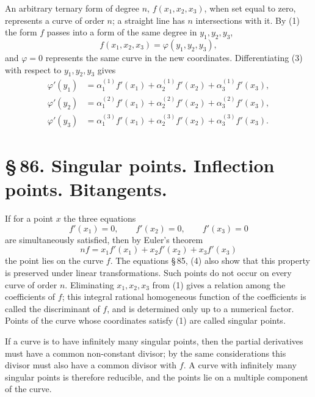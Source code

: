 \documentclass[11pt]{article}
\begin{document}
An arbitrary ternary form of degree $n$, $f(x_1,x_2,x_3)$, when set equal to zero, represents a curve of order $n$; a straight line has $n$ intersections with it. By (1) the form $f$ passes into a form of the same degree in $y_1,y_2,y_3$,
\begin{equation}
 f(x_1,x_2,x_3)=\varphi(y_1,y_2,y_3),
 \tag{3}
\end{equation}
and $\varphi=0$ represents the same curve in the new coordinates. Differentiating (3) with respect to $y_1,y_2,y_3$ gives
\begin{equation}
\begin{aligned}
 \varphi'(y_1)&=\alpha^{(1)}_1 f'(x_1)+\alpha^{(1)}_2 f'(x_2)+\alpha^{(1)}_3 f'(x_3),\\
 \varphi'(y_2)&=\alpha^{(2)}_1 f'(x_1)+\alpha^{(2)}_2 f'(x_2)+\alpha^{(2)}_3 f'(x_3),\\
 \varphi'(y_3)&=\alpha^{(3)}_1 f'(x_1)+\alpha^{(3)}_2 f'(x_2)+\alpha^{(3)}_3 f'(x_3).
\end{aligned}
\tag{4}
\end{equation}

\section*{\S\,86. Singular points. Inflection points. Bitangents.}

If for a point $x$ the three equations
\begin{equation}
 f'(x_1)=0,
 \qquad f'(x_2)=0,
 \qquad f'(x_3)=0
 \tag{1}
\end{equation}
are simultaneously satisfied, then by Euler's theorem
\begin{equation}
 nf=x_1f'(x_1)+x_2f'(x_2)+x_3f'(x_3)
 \tag{2}
\end{equation}
the point lies on the curve $f$. The equations \S\,85, (4) also show that this property is preserved under linear transformations. Such points do not occur on every curve of order $n$. Eliminating $x_1,x_2,x_3$ from (1) gives a relation among the coefficients of $f$; this integral rational homogeneous function of the coefficients is called the discriminant of $f$, and is determined only up to a numerical factor. Points of the curve whose coordinates satisfy (1) are called singular points.

If a curve is to have infinitely many singular points, then the partial derivatives must have a common non-constant divisor; by the same considerations this divisor must also have a common divisor with $f$. A curve with infinitely many singular points is therefore reducible, and the points lie on a multiple component of the curve.
\end{document}
